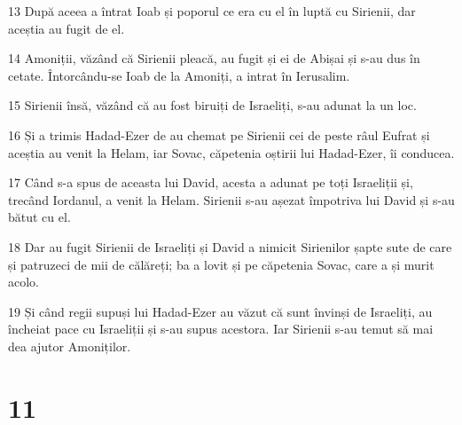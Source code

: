 \par 13 După aceea a întrat Ioab și poporul ce era cu el în luptă cu Sirienii, dar aceștia au fugit de el.
\par 14 Amoniții, văzând că Sirienii pleacă, au fugit și ei de Abișai și s-au dus în cetate. Întorcându-se Ioab de la Amoniți, a intrat în Ierusalim.
\par 15 Sirienii însă, văzând că au fost biruiți de Israeliți, s-au adunat la un loc.
\par 16 Și a trimis Hadad-Ezer de au chemat pe Sirienii cei de peste râul Eufrat și aceștia au venit la Helam, iar Sovac, căpetenia oștirii lui Hadad-Ezer, îi conducea.
\par 17 Când s-a spus de aceasta lui David, acesta a adunat pe toți Israeliții și, trecând Iordanul, a venit la Helam. Sirienii s-au așezat împotriva lui David și s-au bătut cu el.
\par 18 Dar au fugit Sirienii de Israeliți și David a nimicit Sirienilor șapte sute de care și patruzeci de mii de călăreți; ba a lovit și pe căpetenia Sovac, care a și murit acolo.
\par 19 Și când regii supuși lui Hadad-Ezer au văzut că sunt învinși de Israeliți, au încheiat pace cu Israeliții și s-au supus acestora. Iar Sirienii s-au temut să mai dea ajutor Amoniților.

\chapter{11}

